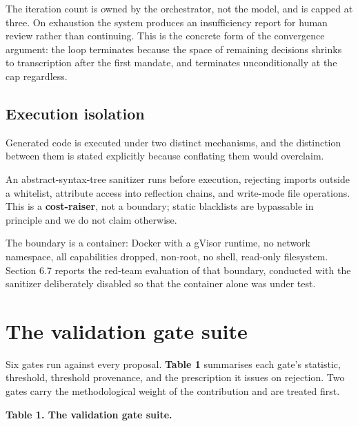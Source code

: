 The iteration count is owned by the orchestrator, not the model, and is capped at three. On exhaustion the system produces an insufficiency report for human review rather than continuing. This is the concrete form of the convergence argument: the loop terminates because the space of remaining decisions shrinks to transcription after the first mandate, and terminates unconditionally at the cap regardless.

\subsection{Execution isolation}
Generated code is executed under two distinct mechanisms, and the distinction between them is stated explicitly because conflating them would overclaim.

An abstract-syntax-tree sanitizer runs before execution, rejecting imports outside a whitelist, attribute access into reflection chains, and write-mode file operations. This is a \textbf{cost-raiser}, not a boundary; static blacklists are bypassable in principle and we do not claim otherwise.

The boundary is a container: Docker with a gVisor runtime, no network namespace, all capabilities dropped, non-root, no shell, read-only filesystem. Section 6.7 reports the red-team evaluation of that boundary, conducted with the sanitizer deliberately disabled so that the container alone was under test.

\section{The validation gate suite}
Six gates run against every proposal. \textbf{Table 1} summarises each gate's statistic, threshold, threshold provenance, and the prescription it issues on rejection. Two gates carry the methodological weight of the contribution and are treated first.

\textbf{Table 1. The validation gate suite.}


